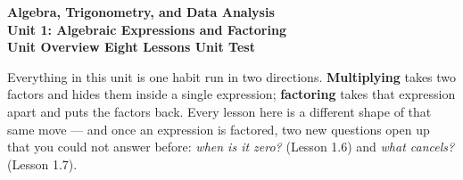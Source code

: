 %

\vspace{-0.8in}

\begin{center}
  {\color{white}\textbf{\LARGE Algebra, Trigonometry, and Data Analysis}}\\[4pt]
  {\color{mistmid}\large\textbf{Unit 1: Algebraic Expressions and Factoring}}\\[6pt]
  {\color{white}\textbf{\large Unit Overview \quad\textbar\quad Eight Lessons \quad\textbar\quad Unit Test}}
\end{center}

\vspace{0.20in}
\namedateperiod
\vspace{0.14in}

\noindent
\small
Everything in this unit is one habit run in two directions. \textbf{Multiplying} takes two
factors and hides them inside a single expression; \textbf{factoring} takes that expression
apart and puts the factors back. Every lesson here is a different shape of that same move ---
and once an expression is factored, two new questions open up that you could not answer before:
\emph{when is it zero?} (Lesson 1.6) and \emph{what cancels?} (Lesson 1.7).

\vspace{0.12in}

